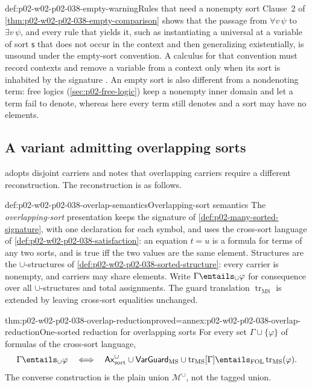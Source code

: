 \begin{hbwarning}{def:p02-w02-p02-038-empty-warning}{Rules that need a nonempty sort}
Clause~2 of \cref{thm:p02-w02-p02-038-empty-comparison} shows that the
passage from \(\forall v\,\psi\) to \(\exists v\,\psi\), and every rule that
yields it, such as instantiating a universal at a variable of sort
\(\mathsf s\) that does not occur in the context and then generalizing
existentially, is unsound under the empty-sort convention.  A calculus
for that convention must record contexts and remove a variable from a
context only when its sort is inhabited by the signature
\cite[Example~2.3.2, p.~11]{Pitts1995Draft}.  An empty sort is also
different from a nondenoting term: free logics
(\cref{sec:p02-free-logic}) keep a nonempty inner domain and let a term
fail to denote, whereas here every term still denotes and a sort may have no
elements.
\end{hbwarning}

\subsection{A variant admitting overlapping sorts}
\label{sec:p02-w02-p02-038-overlap}

 adopts disjoint carriers and notes that
overlapping carriers require a different reconstruction.  The reconstruction
is as follows.

\begin{hbdefinition}{def:p02-w02-p02-038-overlap-semantics}{Overlapping-sort semantics}
The \emph{overlapping-sort} presentation keeps the signature of
\cref{def:p02-many-sorted-signature}, with one declaration for each symbol,
and uses the cross-sort language of \cref{def:p02-w02-p02-038-satisfaction}:
an equation \(t=u\) is a formula for terms of any two sorts, and is true iff
the two values are the same element.  Structures are the
\(\cup\)-structures of \cref{def:p02-w02-p02-038-sorted-structure}: every
carrier is nonempty, and carriers may share elements.  Write
\(\Gamma\entails_{\cup}\varphi\) for consequence over all
\(\cup\)-structures and total assignments.  The guard translation
\(\operatorname{tr}_{\mathrm{MS}}\) is extended by leaving cross-sort
equalities unchanged.
\end{hbdefinition}

\begin{hbtheorem}{thm:p02-w02-p02-038-overlap-reduction}{proved=annex:p02-w02-p02-038-overlap-reduction}{One-sorted reduction for overlapping sorts}
For every set \(\Gamma\cup\{\varphi\}\) of formulas of the cross-sort
language,
\[
 \Gamma\entails_{\cup}\varphi
 \quad\Longleftrightarrow\quad
 \mathsf{Ax}^{\cup}_{\mathrm{sort}}\cup\mathsf{VarGuard}_{\mathrm{MS}}
   \cup\operatorname{tr}_{\mathrm{MS}}[\Gamma]
 \entails_{\mathrm{FOL}}\operatorname{tr}_{\mathrm{MS}}(\varphi).
\]
The converse construction is the plain union \(\mathcal M^{\cup}\), not the
tagged union.
\end{hbtheorem}

